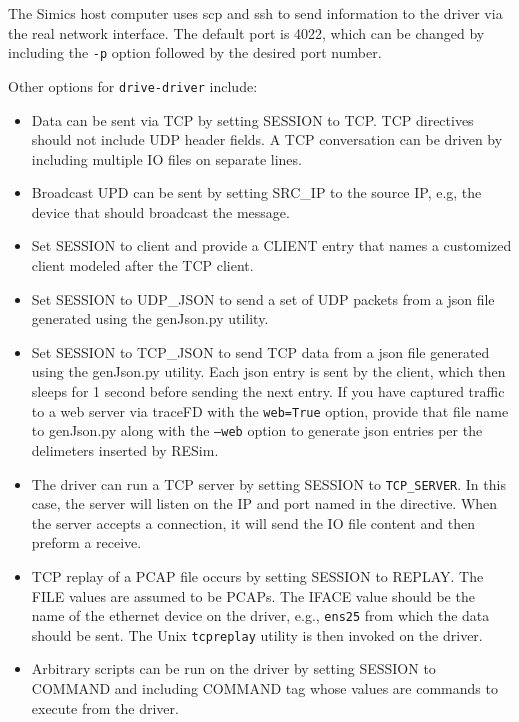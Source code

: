 \documentclass[titlepage]{article}
\begin{document}
The Simics host computer uses scp and ssh to send information to the driver via the real network interface.  The default port is 4022, which can be changed
by including the {\tt -p} option followed by the desired port number.

Other options for {\tt drive-driver} include:
\begin{itemize}
\item Data can be sent via TCP by setting SESSION to TCP.  TCP directives should not include UDP header fields.  A TCP conversation can be driven by
including multiple IO files on separate lines.

\item Broadcast UPD can be sent by setting SRC\_IP to the source IP, e.g, the device that should broadcast the message. 

\item Set SESSION to client and provide a CLIENT entry that names a customized client modeled after the TCP client.

\item Set SESSION to UDP\_JSON to send a set of UDP packets from a json file generated using the genJson.py utility.

\item Set SESSION to TCP\_JSON to send TCP data from a json file generated using the genJson.py utility.  Each json entry is sent by 
the client, which then sleeps for 1 second before sending the next entry.  If you have captured traffic to a web server via traceFD with
the {\tt web=True} option,
provide that file name to genJson.py along with the {\tt --web} option to generate json entries per the delimeters inserted by RESim.

\item The driver can run a TCP server by setting SESSION to {\tt TCP\_SERVER}.  In this case, the server will listen on the IP and port named in the directive.
When the server accepts a connection, it will send the IO file content and then preform a receive.  

\item TCP replay of a PCAP file occurs by setting SESSION to REPLAY.
The FILE values are assumed to be PCAPs.  The IFACE value should be the name of the ethernet device on the driver, e.g., {\tt ens25} from which the data 
should be sent.  The Unix {\tt tcpreplay} utility is then invoked on the driver.

\item Arbitrary scripts can be run on the driver by setting SESSION to COMMAND and including COMMAND tag whose values are commands to execute from the driver.


\end{itemize}
\end{document}
